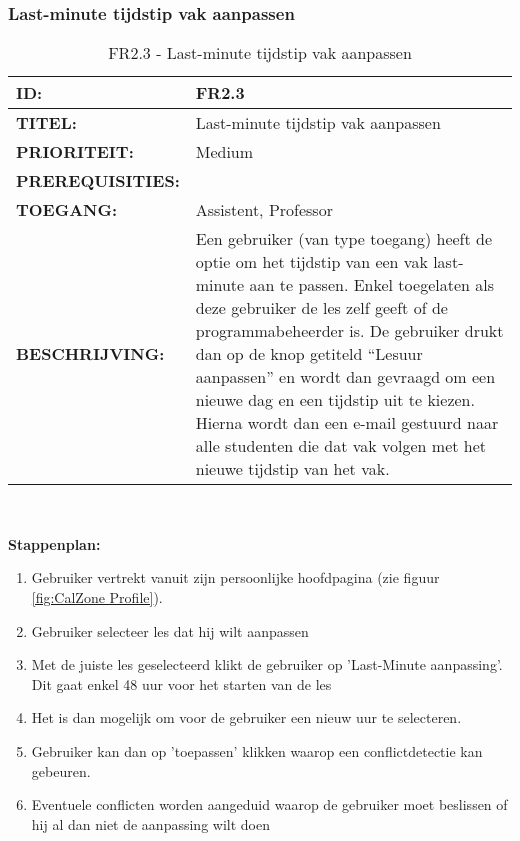 \subsubsection{Last-minute tijdstip vak aanpassen} 
\noindent\begin{table}[H]
            \begin{tabular}{l | p{10cm}}
                \textbf{ID:} & FR2.3 \\ \hline
                \textbf{TITEL:} & Last-minute tijdstip vak aanpassen\\ \hline
                \textbf{PRIORITEIT:} &  Medium \\ \hline
                \textbf{PREREQUISITIES:} & \\ \hline
                \textbf{TOEGANG:} & Assistent, Professor \\ \hline
                \textbf{BESCHRIJVING:} & Een gebruiker (van type toegang) heeft de optie om het tijdstip van een vak last-minute aan te passen. Enkel toegelaten als deze gebruiker de les zelf geeft of de programmabeheerder is.  De gebruiker drukt dan op de knop getiteld “Lesuur aanpassen” en wordt dan gevraagd om een nieuwe dag en een tijdstip uit te kiezen. 
                                        Hierna wordt dan een e-mail gestuurd naar alle studenten die dat vak volgen met het nieuwe tijdstip van het vak.\\ 
            \end{tabular}\\
            \caption{FR2.3 - Last-minute tijdstip vak aanpassen}
            \label{tab:FR2.3 - Last-minute tijdstip vak aanpassen}
        \end{table}
       
\textbf{Stappenplan:}
	\begin{enumerate}
	\item Gebruiker vertrekt vanuit zijn persoonlijke hoofdpagina (zie figuur \ref{fig:CalZone Profile}).
	\item Gebruiker selecteer les dat hij wilt aanpassen
	\item Met de juiste les geselecteerd klikt de gebruiker op 'Last-Minute aanpassing'. Dit gaat enkel 48 uur voor het starten van de les
	\item Het is dan mogelijk om voor de gebruiker een nieuw uur te selecteren.
	\item Gebruiker kan dan op 'toepassen' klikken waarop een conflictdetectie kan gebeuren.
	\item Eventuele conflicten worden aangeduid waarop de gebruiker moet beslissen of hij al dan niet de aanpassing wilt doen
	\end{enumerate}
        
